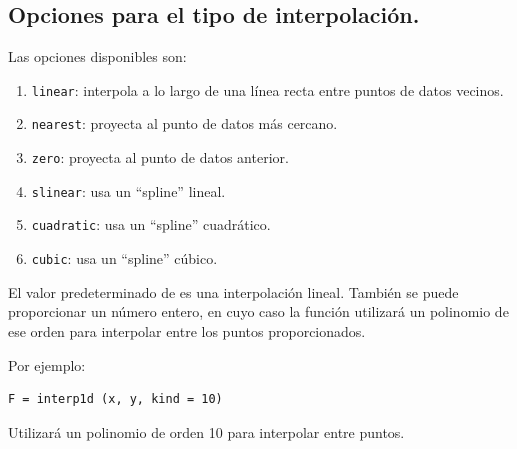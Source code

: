 \subsection*{Opciones para el tipo de interpolación.}
Las opciones disponibles son:
\begin{enumerate}
\item \texttt{linear}: interpola a lo largo de una línea recta entre puntos de datos vecinos.
\item \texttt{nearest}: proyecta al punto de datos más cercano.
\item \texttt{zero}: proyecta al punto de datos anterior.
\item \texttt{slinear}: usa un \enquote{spline} lineal.
\item \texttt{cuadratic}: usa un \enquote{spline} cuadrático.
\item \texttt{cubic}: usa un \enquote{spline} cúbico.
\end{enumerate}
El valor predeterminado de  es una interpolación lineal. También se puede proporcionar un número entero, en cuyo caso la función utilizará un polinomio de ese orden para interpolar entre los puntos proporcionados.
\par
Por ejemplo:
\begin{verbatim}
F = interp1d (x, y, kind = 10)
\end{verbatim}
Utilizará un polinomio de orden 10 para interpolar entre puntos.
